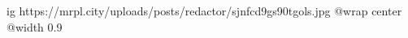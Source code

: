  
 
 
 
 

\ifcmt
  ig https://mrpl.city/uploads/posts/redactor/sjnfcd9gs90tgols.jpg
  @wrap center
  @width 0.9
\fi
